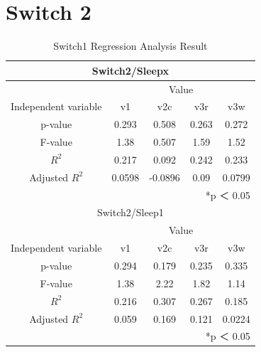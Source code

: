 \documentclass[11pt
  , a4paper
  , article
  , oneside
]{memoir}
\begin{document}
\section{Switch 2}
\begin{table}[h!]
\begin{center}
\begin{tabular}{c|c||c||c||c}
\multicolumn{5}{c}{Switch2/Sleepx}\\ \hline\hline
\multicolumn{1}{c|}{}& \multicolumn{4}{c}{Value}\\
\cline{1-5}
Independent variable & v1 & v2c & v3r & v3w      \\ \hline\hline
p-value & 0.293 & 0.508 & 0.263 & 0.272\\ 
F-value & 1.38 & 0.507 & 1.59 & 1.52\\ 
$  R^2  $ & 0.217 & 0.092 & 0.242 & 0.233\\ 
Adjusted $  R^2  $ & 0.0598 & -0.0896 & 0.09 & 0.0799\\ \hline\hline
\multicolumn{5}{r}{*p ＜ 0.05} \\ 
\multicolumn{5}{c}{Switch2/Sleep1}\\ \hline\hline
\multicolumn{1}{c|}{}& \multicolumn{4}{c}{Value}\\
\cline{1-5}
Independent variable & v1 & v2c & v3r & v3w      \\ \hline\hline
p-value &  0.294 &  0.179& 0.235  &  0.335\\ 
F-value &  1.38 &  2.22 &  1.82  &  1.14\\ 
$  R^2  $ &  0.216 &  0.307&  0.267 & 0.185\\ 
Adjusted $  R^2  $ & 0.059 & 0.169 & 0.121 & 0.0224\\ \hline\hline
\multicolumn{5}{r}{*p ＜ 0.05} \\ 
\end{tabular}
\caption{Switch1 Regression Analysis Result }
\end{center}
\end{table} 
\clearpage
\end{document}
